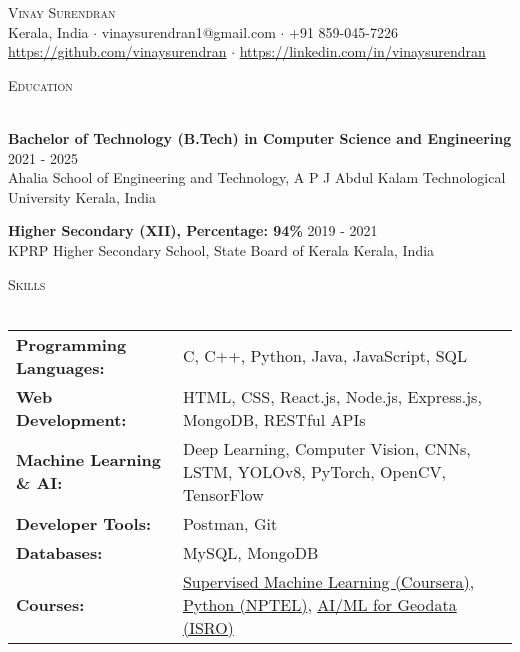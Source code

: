 \documentclass[letterpaper]{article}
\newcommand{\lineunder} {
    \vspace*{-8pt} \\
    \hspace*{-18pt} \hrulefill \\
}
\newcommand{\header} [1] {
    {\hspace*{-18pt}\vspace*{6pt} \textsc{#1}}
    \vspace*{-6pt} \lineunder
}
\begin{document}
\vspace*{-40pt}

\vspace*{-10pt}
\begin{center}
	{\Huge \scshape {Vinay Surendran}}\\
	Kerala, India $\cdot$ vinaysurendran1@gmail.com $\cdot$ +91 859-045-7226 \\ \href{https://github.com/vinaysurendran}{https://github.com/vinaysurendran} $\cdot$ \href{https://linkedin.com/in/vinaysurendran}{https://linkedin.com/in/vinaysurendran}\\
\end{center}

\header{Education}
\vspace{1mm}

    \textbf{Bachelor of Technology (B.Tech) in Computer Science and Engineering} \hfill 2021 - 2025\\
    Ahalia School of Engineering and Technology, A P J Abdul Kalam Technological University \hfill Kerala, India\\
    \vspace{2mm}

    \textbf{Higher Secondary (XII), Percentage: 94\%} \hfill 2019 - 2021\\
    KPRP Higher Secondary School, State Board of Kerala \hfill Kerala, India\\
    \vspace{2mm}

\header{Skills}
\vspace{1.5mm}
\hspace{-3mm}
\begin{tabular}{ l l }
    \textbf{Programming Languages:} & C, C++, Python, Java, JavaScript, SQL \\
    \textbf{Web Development:} & HTML, CSS, React.js, Node.js, Express.js, MongoDB, RESTful APIs \\
    \textbf{Machine Learning \& AI:} & Deep Learning, Computer Vision, CNNs, LSTM, YOLOv8, PyTorch, OpenCV, TensorFlow \\
    \textbf{Developer Tools:} & Postman, Git \\
    \textbf{Databases:} & MySQL, MongoDB \\
    \textbf{Courses:} & \href{https://www.coursera.org/account/accomplishments/verify/URZKT4I7UZG0}{Supervised Machine Learning (Coursera)}, \href{https://www.linkedin.com/in/vinaysurendran/details/certifications/1733478363869/single-media-viewer/?profileId=ACoAADpPC44B_pc45X9q_UgVRuf3PKmuhrKl-lI}{Python (NPTEL)}, \href{https://www.linkedin.com/in/vinaysurendran/details/certifications/1733479073137/single-media-viewer/?profileId=ACoAADpPC44B_pc45X9q_UgVRuf3PKmuhrKl-lI}{AI/ML for Geodata (ISRO)} \\
\end{tabular}
\vspace{2mm}
\end{document}
